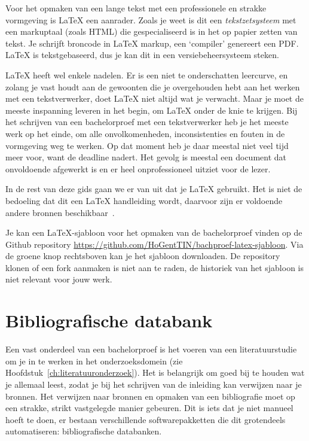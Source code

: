 Voor het opmaken van een lange tekst met een professionele en strakke vormgeving is {\LaTeX} een aanrader. Zoals je weet is dit een \emph{tekstzetsysteem} met een markuptaal (zoals HTML) die gespecialiseerd is in het op papier zetten van tekst. Je schrijft broncode in LaTeX markup, een `compiler' genereert een PDF. {\LaTeX} is tekstgebaseerd, dus je kan dit in een versiebeheersysteem steken.

{\LaTeX} heeft wel enkele nadelen. Er is een niet te onderschatten leercurve, en zolang je vast houdt aan de gewoonten die je overgehouden hebt aan het werken met een tekstverwerker, doet {\LaTeX} niet altijd wat je verwacht. Maar je moet de meeste inspanning leveren in het begin, om {\LaTeX} onder de knie te krijgen. Bij het schrijven van een bachelorproef met een tekstverwerker heb je het meeste werk op het einde, om alle onvolkomenheden, inconsistenties en fouten in de vormgeving weg te werken. Op dat moment heb je daar meestal niet veel tijd meer voor, want de deadline nadert. Het gevolg is meestal een document dat onvoldoende afgewerkt is en er heel onprofessioneel uitziet voor de lezer.

In de rest van deze gids gaan we er van uit dat je {\LaTeX} gebruikt. Het is niet de bedoeling dat dit een {\LaTeX} handleiding wordt, daarvoor zijn er voldoende andere bronnen beschikbaar~\autocite{Oetiker2015}.

Je kan een {\LaTeX}-sjabloon voor het opmaken van de bachelorproef vinden op de Github repository \url{https://github.com/HoGentTIN/bachproef-latex-sjabloon}. Via de groene knop rechtsboven kan je het sjabloon downloaden. De repository klonen of een fork aanmaken is niet aan te raden, de historiek van het sjabloon is niet relevant voor jouw werk.


\section{Bibliografische databank}
\label{sec:bibliografische-databank}

Een vast onderdeel van een bachelorproef is het voeren van een literatuurstudie om je in te werken in het onderzoeksdomein (zie Hoofdstuk~\ref{ch:literatuuronderzoek}). Het is belangrijk om goed bij te houden wat je allemaal leest, zodat je bij het schrijven van de inleiding kan verwijzen naar je bronnen. Het verwijzen naar bronnen en opmaken van een bibliografie moet op een strakke, strikt vastgelegde manier gebeuren. Dit is iets dat je niet manueel hoeft te doen, er bestaan verschillende softwarepakketten die dit grotendeels automatiseren: bibliografische databanken.


